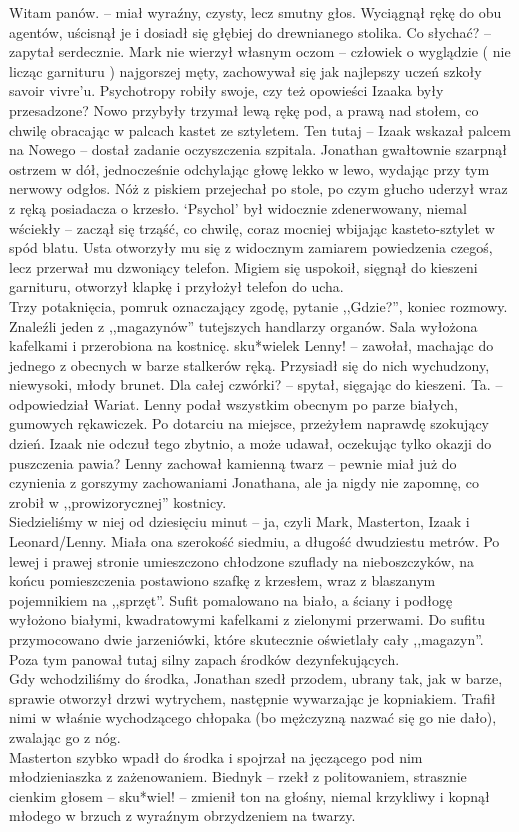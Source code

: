 \documentclass[../MAIN.tex]{subfiles}
\begin{document}
%
\sx Witam panów. -- miał wyraźny, czysty, lecz smutny głos. Wyciągnął rękę do obu agentów, uścisnął je i dosiadł się głębiej do drewnianego stolika.
\xx Co słychać? -- zapytał serdecznie.
\qd
Mark nie wierzył własnym oczom -- człowiek o wyglądzie ( nie licząc garnituru ) najgorszej męty, zachowywał się jak najlepszy uczeń szkoły savoir vivre’u. Psychotropy robiły swoje, czy też opowieści Izaaka były przesadzone? Nowo przybyły trzymał lewą rękę pod, a prawą nad stołem, co chwilę obracając w palcach kastet ze sztyletem.
\sx Ten tutaj -- Izaak wskazał palcem na Nowego -- dostał zadanie oczyszczenia szpitala. \qd
Jonathan gwałtownie szarpnął ostrzem w dół, jednocześnie odchylając głowę lekko w lewo, wydając przy tym nerwowy odgłos. Nóż z piskiem przejechał po stole, po czym głucho uderzył wraz z ręką posiadacza o krzesło. ‘Psychol’ był widocznie zdenerwowany, niemal wściekły -- zaczął się trząść, co chwilę, coraz mocniej wbijając kasteto-sztylet w spód blatu. Usta otworzyły mu się z widocznym zamiarem powiedzenia czegoś, lecz przerwał mu dzwoniący telefon. Migiem się uspokoił, sięgnął do kieszeni garnituru, otworzył klapkę i przyłożył telefon do ucha. \\
Trzy potaknięcia, pomruk oznaczający zgodę, pytanie ,,Gdzie?'', koniec rozmowy.
\sx Znaleźli jeden z ,,magazynów'' tutejszych handlarzy organów. Sala wyłożona kafelkami i przerobiona na kostnicę. sku*wiele\3k Lenny! -- zawołał, machając do jednego z obecnych w barze stalkerów ręką.
\qd
Przysiadł się do nich wychudzony, niewysoki, młody brunet.
\sx Dla całej czwórki? -- spytał, sięgając do kieszeni.
\xx Ta. -- odpowiedział Wariat.
\qd
Lenny podał wszystkim obecnym po parze białych, gumowych rękawiczek.
%
%
Po dotarciu na miejsce, przeżyłem naprawdę szokujący dzień. Izaak nie odczuł tego zbytnio, a może udawał, oczekując tylko
okazji do puszczenia pawia? Lenny zachował kamienną twarz -- pewnie miał już do czynienia z gorszymy zachowaniami Jonathana, ale ja nigdy nie zapomnę, co zrobił w ,,prowizorycznej'' kostnicy. \\
Siedzieliśmy w niej od dziesięciu minut -- ja, czyli Mark, Masterton, Izaak i Leonard/Lenny. Miała ona szerokość siedmiu, a długość dwudziestu metrów. Po lewej i prawej stronie umieszczono chłodzone szuflady na nieboszczyków, na końcu pomieszczenia postawiono szafkę z krzesłem, wraz z blaszanym pojemnikiem na ,,sprzęt''. Sufit pomalowano na biało, a ściany i podłogę wyłożono białymi, kwadratowymi kafelkami z zielonymi przerwami. Do sufitu przymocowano dwie jarzeniówki, które skutecznie oświetlały cały ,,magazyn''. Poza tym panował tutaj silny zapach środków dezynfekujących. \\
Gdy wchodziliśmy do środka, Jonathan szedł przodem, ubrany tak, jak w barze, sprawie otworzył drzwi wytrychem, następnie wywarzając je kopniakiem. Trafił nimi w właśnie wychodzącego chłopaka (bo mężczyzną nazwać się go nie dało), zwalając go z nóg. \\
Masterton szybko wpadł do środka i spojrzał na jęczącego pod nim młodzieniaszka z zażenowaniem.
%
\sx Biedny\3k -- rzekł z politowaniem, strasznie cienkim głosem -- sku*wiel! -- zmienił ton na głośny, niemal krzykliwy i kopnął młodego w brzuch z wyraźnym obrzydzeniem na twarzy.
\end{document}

